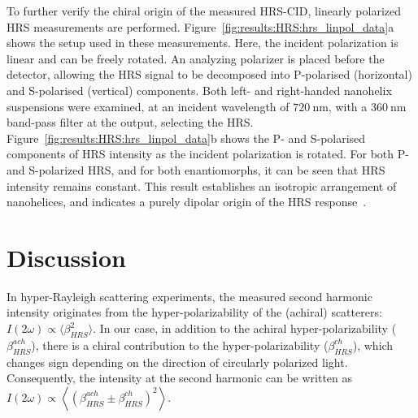 To further verify the chiral origin of the measured HRS-CID, linearly polarized HRS measurements are performed. Figure~\ref{fig:results:HRS:hrs_linpol_data}a shows the setup used in these measurements. Here, the incident polarization is linear and can be freely rotated. An analyzing polarizer is placed before the detector, allowing the HRS signal to be decomposed into P-polarised (horizontal) and S-polarised (vertical) components. Both left- and right-handed nanohelix suspensions were examined, at an incident wavelength of $\SI{720}{\nano\m}$, with a $\SI{360}{\nano\m}$ band-pass filter at the output, selecting the HRS. 
Figure~\ref{fig:results:HRS:hrs_linpol_data}b shows the P- and S-polarised components of HRS intensity as the incident polarization is rotated. For both P- and S-polarized HRS, and for both enantiomorphs, it can be seen that HRS intensity remains constant. This result establishes an isotropic arrangement of nanohelices, and indicates a purely dipolar origin of the HRS response~\cite{Hao2002b, verbiest2009second}. 

\section{Discussion}

In hyper-Rayleigh scattering experiments, the measured second harmonic intensity originates from the hyper-polarizability of the (achiral) scatterers: $I(2\omega) \propto \langle \beta^{2}_{HRS} \rangle$.
In our case, in addition to the achiral hyper-polarizability ($\beta^{ach}_{HRS}$), there is a chiral contribution to the hyper-polarizability ($\beta^{ch}_{HRS}$), which changes sign depending on the direction of circularly polarized light. Consequently, the intensity at the second harmonic can be written as $I\left( {2\omega } \right) \propto \left\langle {{{\left( {\beta _{HRS}^{ach} \pm \beta _{HRS}^{ch}} \right)}^2}} \right\rangle$.

